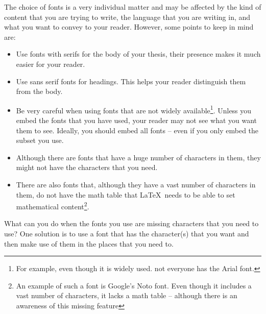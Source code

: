 \documentclass[examplethesis.tex]{subfiles}
\begin{document}
The choice of fonts is a very individual matter and may be affected by the kind of content that you are trying to write, the language that you are writing in, and what you want to convey to your reader. However, some points to keep in mind are:
\begin{itemize}
    \item Use fonts with serifs for the body of your thesis, their presence makes it much easier for your reader.

    \item Use sans serif fonts for headings. This helps your reader distinguish them from the body.

    \item Be very careful when using fonts that are not widely available\footnote{For example, even though it is widely used. not everyone has the Arial font.}. Unless you embed the fonts that you have used, your reader may not see what you want them to see. Ideally, you should embed all fonts -- even if you only embed the subset you use.

    \item Although there are fonts that have a huge number of characters in them, they might not have the characters that you need.

    \item There are also fonts that, although they have a vast number of characters in them, do not have the math table that \LaTeX\ needs to be able to set mathematical content\footnote{An example of such a font is Google's Noto font. Even though it includes a vast number of characters, it lacks a math table -- although there is an awareness of this missing feature}.
\end{itemize}

What can you do when the fonts you use are missing characters that you need to use? One solution is to use a font that has the character(s) that you want and then make use of them in the places that you need to.

\end{document}

